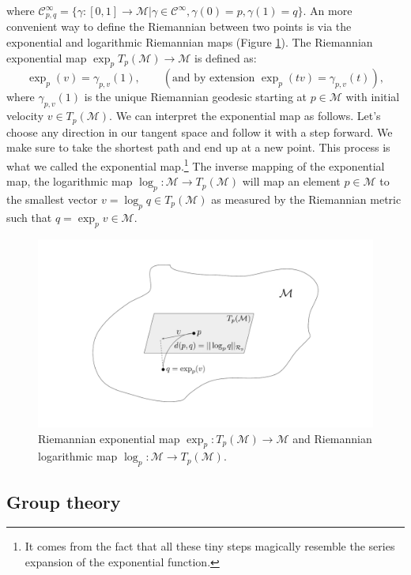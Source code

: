 \documentclass{article}
\begin{document}
where $\mathcal{C}^\infty_{p, q} = \{ \gamma : [0, 1] \to \mathcal{M} | \gamma \in \mathcal{C}^\infty, \gamma(0) = p,  \gamma(1) = q\}$. An more convenient way to define the Riemannian between two points is via the exponential and logarithmic Riemannian maps (Figure \ref{fig:explogmap}). The Riemannian exponential map $\exp_p T_p(\mathcal{M}) \to \mathcal{M}$ is defined as:
\begin{equation}
\exp_p (v) = \gamma_{p, v}(1) ,\qquad (\text{and by extension } \exp_p (tv) = \gamma_{p, v}(t)),
\end{equation}
where $\gamma_{p,v}(1)$ is the unique Riemannian geodesic starting at $p \in \mathcal{M}$ with initial velocity $v \in T_p(\mathcal{M})$. We can interpret the exponential map as follows. Let’s choose any direction in our tangent space and follow it with a step forward. We make sure to take the shortest path and end up at a new point. This process is what we called the exponential map.\footnote{It comes from the fact that all these tiny steps magically resemble the series expansion of the exponential function.} The inverse mapping of the exponential map, the logarithmic map $\log_p : \mathcal{M} \to T_p(\mathcal{M})$ will map an element $p \in \mathcal{M}$ to the smallest vector $v = \log_p q \in T_p(\mathcal{M})$ as measured by the Riemannian metric such that $q = \exp_p v \in \mathcal{M}$. 

\begin{figure}[h!]
    \centering
    \includegraphics[width=\textwidth]{Images/distexplog.pdf}
    \caption{Riemannian exponential map $\exp_p : T_p(\mathcal{M}) \to \mathcal{M}$ and Riemannian logarithmic map $\log_p : \mathcal{M} \to T_p(\mathcal{M})$.}
    \label{fig:explogmap}
\end{figure}


\subsection{Group theory} \label{app:group_theory}
\end{document}

